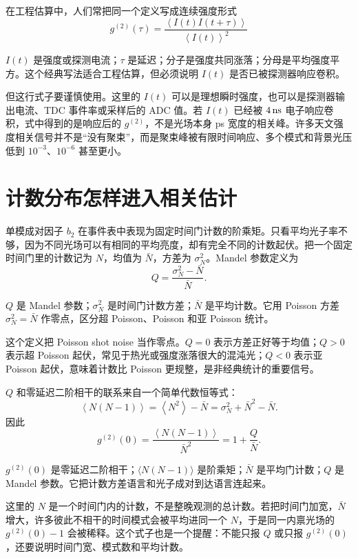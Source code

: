 在工程估算中，人们常把同一个定义写成连续强度形式
\begin{equation}
  g^{(2)}(\tau)=
  \frac{\left\langle I(t)I(t+\tau)\right\rangle}
       {\left\langle I(t)\right\rangle^2}
  \label{eq:ch04-classical-g2}
\end{equation}
\begin{formulaexplain}
\(I(t)\) 是强度或探测电流；\(\tau\) 是延迟；分子是强度共同涨落；分母是平均强度平方。这个经典写法适合工程估算，但必须说明 \(I(t)\) 是否已被探测器响应卷积。
\end{formulaexplain}
但这行式子要谨慎使用。这里的 \(I(t)\) 可以是理想瞬时强度，也可以是探测器输出电流、TDC 事件率或采样后的 ADC 值。若 \(I(t)\) 已经被 \(4\,{\rm ns}\) 电子响应卷积，式中得到的是响应后的 \(g^{(2)}\)，不是光场本身 ps 宽度的相关峰。许多天文强度相关信号并不是“没有聚束”，而是聚束峰被有限时间响应、多个模式和背景光压低到 \(10^{-3}\)、\(10^{-6}\) 甚至更小。

\section{计数分布怎样进入相关估计}

单模成对因子 \(b_2\) 在事件表中表现为固定时间门计数的阶乘矩。只看平均光子率不够，因为不同光场可以有相同的平均亮度，却有完全不同的计数起伏。把一个固定时间门里的计数记为 \(N\)，均值为 \(\bar{N}\)，方差为 \(\sigma_N^2\)。Mandel 参数定义为
\begin{equation}
  Q=\frac{\sigma_N^2-\bar{N}}{\bar{N}}.
  \label{eq:ch04-mandel-q}
\end{equation}
\begin{formulaexplain}
\(Q\) 是 Mandel 参数；\(\sigma_N^2\) 是时间门计数方差；\(\bar N\) 是平均计数。它用 Poisson 方差 \(\sigma_N^2=\bar N\) 作零点，区分超 Poisson、Poisson 和亚 Poisson 统计。
\end{formulaexplain}
这个定义把 Poisson shot noise 当作零点。\(Q=0\) 表示方差正好等于均值；\(Q>0\) 表示超 Poisson 起伏，常见于热光或强度涨落很大的混沌光；\(Q<0\) 表示亚 Poisson 起伏，意味着计数比 Poisson 更规整，是非经典统计的重要信号。

\(Q\) 和零延迟二阶相干的联系来自一个简单代数恒等式：
\[
  \left\langle N(N-1)\right\rangle
  =
  \left\langle N^2\right\rangle-\bar{N}
  =
  \sigma_N^2+\bar{N}^2-\bar{N}.
\]
因此
\begin{equation}
  g^{(2)}(0)=
  \frac{\left\langle N(N-1)\right\rangle}{\bar{N}^2}
  =
  1+\frac{Q}{\bar{N}}.
  \label{eq:ch04-q-g2}
\end{equation}
\begin{formulaexplain}
\(g^{(2)}(0)\) 是零延迟二阶相干；\(\langle N(N-1)\rangle\) 是阶乘矩；\(\bar N\) 是平均门计数；\(Q\) 是 Mandel 参数。它把计数方差语言和光子成对到达语言连起来。
\end{formulaexplain}
这里的 \(N\) 是一个时间门内的计数，不是整晚观测的总计数。若把时间门加宽，\(\bar{N}\) 增大，许多彼此不相干的时间模式会被平均进同一个 \(N\)，于是同一内禀光场的 \(g^{(2)}(0)-1\) 会被稀释。这个式子也是一个提醒：不能只报 \(Q\) 或只报 \(g^{(2)}(0)\)，还要说明时间门宽、模式数和平均计数。

